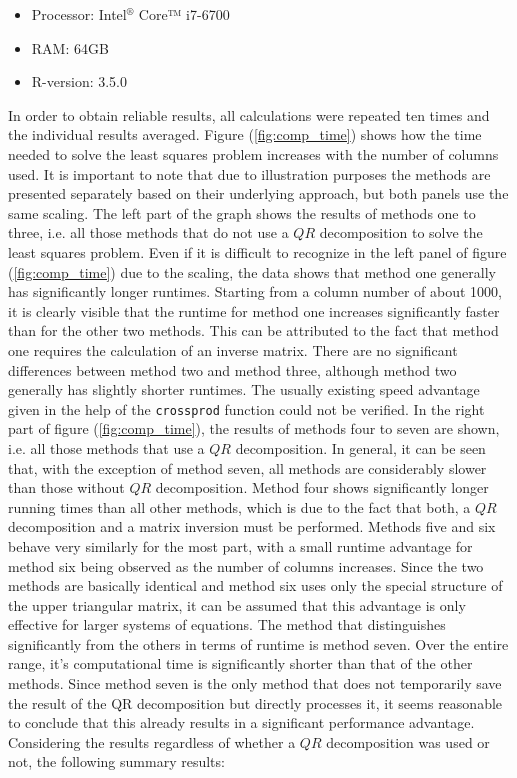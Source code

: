 \begin{itemize}
	\item Processor: Intel$^{®}$ Core™ i7-6700
	\item RAM: 64GB
	\item \textsf{R}-version: 3.5.0
\end{itemize}

In order to obtain reliable results, all calculations were repeated ten times and the individual results averaged. Figure (\ref{fig:comp_time}) shows how the time needed to solve the least squares problem increases with the number of columns used. It is important to note that due to illustration purposes the methods are presented separately based on their underlying approach, but both panels use the same scaling. The left part of the graph shows the results of methods one to three, i.e. all those methods that do not use a $QR$ decomposition to solve the least squares problem. Even if it is difficult to recognize in the left panel of figure (\ref{fig:comp_time}) due to the scaling, the data shows that method one generally has significantly longer runtimes. Starting from a column number of about 1000, it is clearly visible that the runtime for method one increases significantly faster than for the other two methods. This can be attributed to the fact that method one requires the calculation of an inverse matrix. There are no significant differences between method two and method three, although method two generally has slightly shorter runtimes. The usually existing speed advantage given in the help of the \texttt{crossprod} function could not be verified. In the right part of figure (\ref{fig:comp_time}), the results of methods four to seven are shown, i.e. all those methods that use a $QR$ decomposition. In general, it can be seen that, with the exception of method seven, all methods are considerably slower than those without $QR$ decomposition. Method four shows significantly longer running times than all other methods, which is due to the fact that both, a $QR$ decomposition and a matrix inversion must be performed. Methods five and six behave very similarly for the most part, with a small runtime advantage for method six being observed as the number of columns increases. Since the two methods are basically identical and method six uses only the special structure of the upper triangular matrix, it can be assumed that this advantage is only effective for larger systems of equations. The method that distinguishes significantly from the others in terms of runtime is method seven. Over the entire range, it's computational time is significantly shorter than that of the other methods. Since method seven is the only method that does not temporarily save the result of the QR decomposition but directly processes it, it seems reasonable to conclude that this already results in a significant performance advantage. Considering the results regardless of whether a $QR$ decomposition was used or not, the following summary results:

